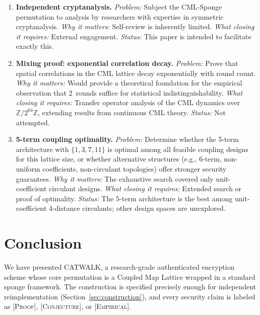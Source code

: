 \documentclass[runningheads]{llncs}
\newcommand{\Ztwo}{\mathbb{Z}/2^{64}\mathbb{Z}}
\begin{document}
\begin{enumerate}
\item \textbf{Independent cryptanalysis.}
  \emph{Problem:} Subject the CML-Sponge permutation to analysis by
  researchers with expertise in symmetric cryptanalysis.
  \emph{Why it matters:} Self-review is inherently limited.
  \emph{What closing it requires:} External engagement.
  \emph{Status:} This paper is intended to facilitate exactly this.

\item \textbf{Mixing proof: exponential correlation decay.}
  \emph{Problem:} Prove that spatial correlations in the CML lattice decay
  exponentially with round count.
  \emph{Why it matters:} Would provide a theoretical foundation for the
  empirical observation that 2~rounds suffice for statistical indistinguishability.
  \emph{What closing it requires:} Transfer operator analysis of the CML
  dynamics over~$\Ztwo$, extending results from continuous CML theory.
  \emph{Status:} Not attempted.

\item \textbf{5-term coupling optimality.}
  \emph{Problem:} Determine whether the 5-term architecture with
  $\{1,3,7,11\}$ is optimal among all feasible coupling designs for this
  lattice size, or whether alternative structures (e.g., 6-term, non-uniform
  coefficients, non-circulant topologies) offer stronger security guarantees.
  \emph{Why it matters:} The exhaustive search covered only unit-coefficient
  circulant designs.
  \emph{What closing it requires:} Extended search or proof of optimality.
  \emph{Status:} The 5-term architecture is the best among unit-coefficient
  4-distance circulants; other design spaces are unexplored.

\end{enumerate}

\section{Conclusion}
\label{sec:conclusion}

We have presented CATWALK, a research-grade authenticated encryption scheme
whose core permutation is a Coupled Map Lattice wrapped in a standard sponge
framework.  The construction is specified precisely enough for independent
reimplementation (Section~\ref{sec:construction}), and every security claim
is labeled as \textsc{[Proof]}, \textsc{[Conjecture]}, or \textsc{[Empirical]}.
\end{document}
